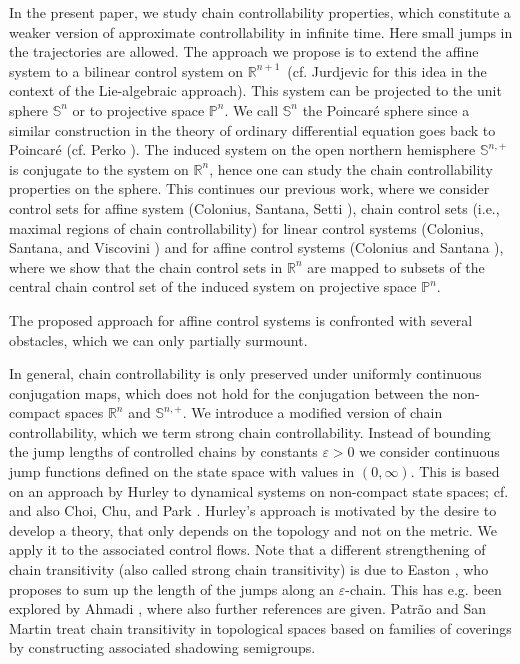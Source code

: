 \documentclass[preprint,12pt]{elsarticle}
\begin{document}
In the present paper, we study chain controllability properties, which
constitute a weaker version of approximate controllability in infinite time.
Here small jumps in the trajectories are allowed. The approach we propose is
to extend the affine system to a bilinear control system on $\mathbb{R}^{n+1}%
$\ (cf. Jurdjevic \cite{Jurd84} for this idea in the context of the
Lie-algebraic approach). This system can be projected to the unit sphere
$\mathbb{S}^{n}$ or to projective space $\mathbb{P}^{n}$. We call
$\mathbb{S}^{n}$ the Poincar\'{e} sphere since a similar construction in the
theory of ordinary differential equation goes back to Poincar\'{e} \cite{Poin}
(cf. Perko \cite{Perko}). The induced system on the open northern hemisphere
$\mathbb{S}^{n,+}$ is conjugate to the system on $\mathbb{R}^{n}$, hence one
can study the chain controllability properties on the sphere. This continues
our previous work, where we consider control sets for affine system (Colonius,
Santana, Setti \cite{ColSS23}), chain control sets (i.e., maximal regions of
chain controllability) for linear control systems (Colonius, Santana, and
Viscovini \cite{ColSV24}) and for affine control systems (Colonius and Santana
\cite{ColS24a}), where we show that the chain control sets in $\mathbb{R}^{n}$
are mapped to subsets of the central chain control set of the induced system
on projective space $\mathbb{P}^{n}$.

The proposed approach for affine control systems is confronted with several
obstacles, which we can only partially surmount.

In general, chain controllability is only preserved under uniformly continuous
conjugation maps, which does not hold for the conjugation between the
non-compact spaces $\mathbb{R}^{n}$ and $\mathbb{S}^{n,+}$. We introduce a
modified version of chain controllability, which we term strong chain
controllability. Instead of bounding the jump lengths of controlled chains by
constants $\varepsilon>0$ we consider continuous jump functions defined on the
state space with values in $(0,\infty)$. This is based on an approach by
Hurley to dynamical systems on non-compact state spaces; cf. \cite{Hur92,
Hur95} and also Choi, Chu, and Park \cite{ChoiCP02}. Hurley's approach is
motivated by the desire to develop a theory, that only depends on the
topology and not on the metric. We apply it to the associated control flows.
Note that a different strengthening of chain transitivity (also called strong
chain transitivity) is due to Easton \cite{Easton}, who proposes to sum up the
length of the jumps along an $\varepsilon$-chain. This has e.g. been explored
by Ahmadi \cite{Ahma24}, where also further references are given. Patr\~{a}o
and San Martin \cite{PatSM07} treat chain transitivity in topological spaces
based on families of coverings by constructing associated shadowing semigroups.
\end{document}
